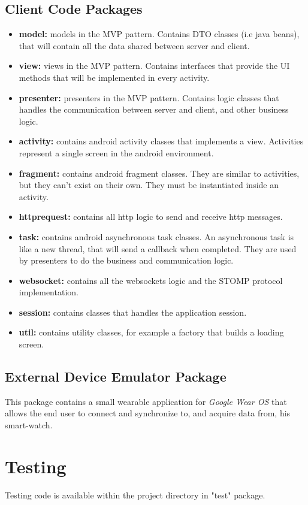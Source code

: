 \documentclass[a4paper]{article}
\begin{document}
\subsection{Client Code Packages}
\begin{itemize}
\item \textbf{model:} models in the MVP pattern. Contains DTO classes (i.e java beans), that will contain all the data shared between server and client.
\item \textbf{view:} views in the MVP pattern. Contains interfaces that provide the UI methods that will be implemented in every activity.
\item \textbf{presenter:} presenters in the MVP pattern. Contains logic classes that handles the communication between server and client, and other business logic.
\item \textbf{activity:} contains android activity classes that implements a view. Activities represent a single screen in the android environment.
\item \textbf{fragment:} contains android fragment classes. They are similar to activities, but they can't exist on their own. They must be instantiated inside an activity.
\item \textbf{httprequest:} contains all http logic to send and receive http messages.
\item \textbf{task:} contains android asynchronous task classes. An asynchronous task is like a new thread, that will send a callback when completed. They are used by presenters to do the business and communication logic.
\item \textbf{websocket:} contains all the websockets logic and the STOMP protocol implementation.
\item \textbf{session:} contains classes that handles the application session.
\item \textbf{util:} contains utility classes, for example a factory that builds a loading screen.
\end{itemize}

\subsection{External Device Emulator Package}
This package contains a small wearable application for \textit{Google Wear OS} that allows the end user to connect and synchronize to, and acquire data from, his smart-watch.

\newpage
\section{Testing}
Testing code is available within the project directory in "test" package.
\end{document}
